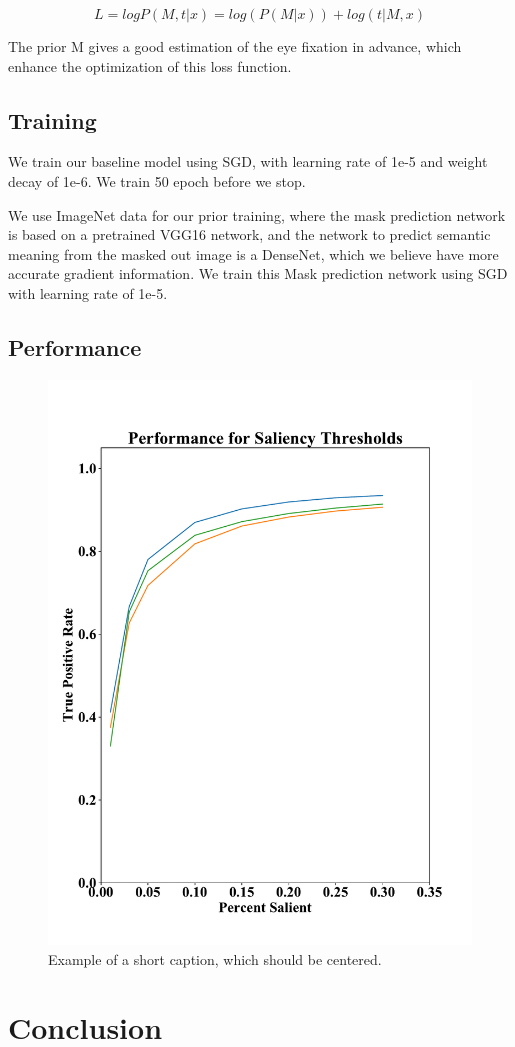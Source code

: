 \documentclass[10pt,twocolumn,letterpaper]{article}
\begin{document}
 $$L = logP(M, t|x) = log(P(M|x)) + log(t|M, x)$$
 
 The prior M gives a good estimation of the eye fixation in advance, which enhance the optimization of this loss function.
 
 
 
\subsection{Training}
We train our baseline model using SGD, with learning rate of 1e-5 and weight decay of 1e-6. We train 50 epoch before we stop.

We use ImageNet data for our prior training, where the mask prediction network is based on a pretrained VGG16 network, and the network to predict semantic meaning from the masked out image is a DenseNet, which we believe have more accurate gradient information. We train this Mask prediction network using SGD with learning rate of 1e-5.


\subsection{Performance}

\begin{figure}
\begin{center}
\includegraphics[width=\columnwidth]{figures/tpr.pdf}

\end{center}
   \caption{Example of a short caption, which should be centered.}
\label{fig:short}
\end{figure}

\section{Conclusion}

{\small


}
\end{document}
